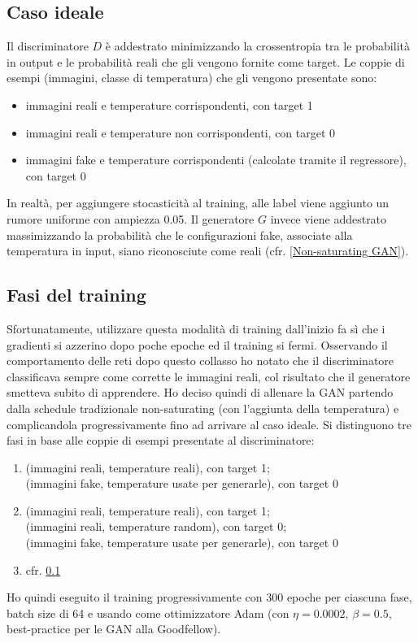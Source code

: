 \documentclass[Lau, noexaminfo, oneside]{sapthesis} %
\begin{document}
\subsection{Caso ideale}
\label{Caso ideale}
Il discriminatore $D$ è addestrato minimizzando la crossentropia tra le probabilità in output e le probabilità reali che gli vengono fornite come target. Le coppie di esempi (immagini, classe di temperatura) che gli vengono presentate sono:
\begin{itemize}
\item immagini reali e temperature corrispondenti, con target 1
\item immagini reali e temperature non corrispondenti, con target 0
\item immagini fake e temperature corrispondenti (calcolate tramite il regressore), con target 0
\end{itemize}
In realtà, per aggiungere stocasticità al training, alle label viene aggiunto un rumore uniforme con ampiezza 0.05.
Il generatore $G$ invece viene addestrato massimizzando la probabilità che le configurazioni fake, associate alla temperatura in input, siano riconosciute come reali (cfr. \ref{Non-saturating GAN}).
\subsection{Fasi del training}
Sfortunatamente, utilizzare questa modalità di training dall'inizio fa sì che i gradienti si azzerino dopo poche epoche ed il training si fermi. Osservando il comportamento delle reti dopo questo collasso ho notato che il discriminatore classificava sempre come corrette le immagini reali, col risultato che il generatore smetteva subito di apprendere. Ho deciso quindi di allenare la GAN partendo dalla schedule tradizionale non-saturating (con l'aggiunta della temperatura) e complicandola progressivamente fino ad arrivare al caso ideale.
Si distinguono tre fasi in base alle coppie di esempi presentate al discriminatore:
\begin{enumerate}[label=\Alph*:]
\item (immagini reali, temperature reali), con target 1;\\(immagini fake, temperature usate per generarle), con target 0
\item (immagini reali, temperature reali), con target 1;\\(immagini reali, temperature random), con target 0;\\(immagini fake, temperature usate per generarle), con target 0
\item cfr. \ref{Caso ideale}
\end{enumerate}
Ho quindi eseguito il training progressivamente con 300 epoche per ciascuna fase, batch size di 64 e usando come ottimizzatore Adam \cite{adam} (con $\eta=0.0002,\,\beta=0.5$, best-practice per le GAN alla Goodfellow).
\end{document}
